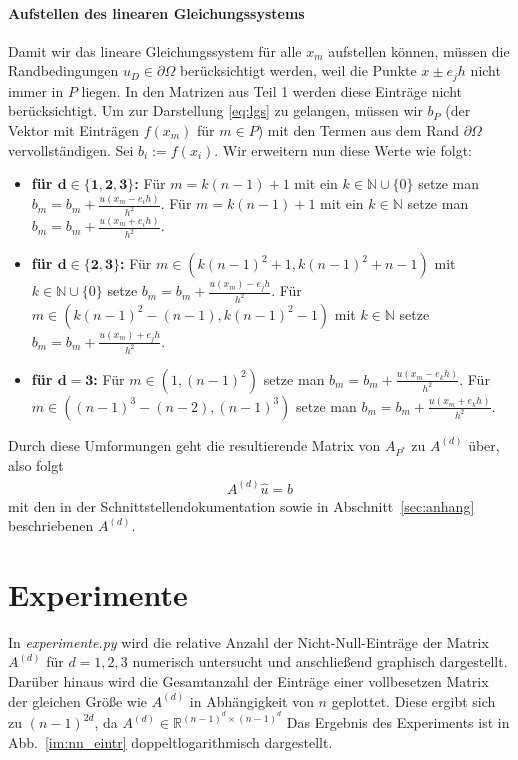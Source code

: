 \documentclass[smallheadings]{scrartcl}
\numberwithin{equation}{section}
\begin{document}
\paragraph{Aufstellen des linearen Gleichungssystems}

Damit wir das lineare Gleichungssystem für alle $x_m$ aufstellen können, müssen die Randbedingungen $u_D \in \partial\Omega$ berücksichtigt werden, weil die Punkte $x \pm e_jh$ nicht immer in $P$ liegen. In den Matrizen aus Teil 1 werden diese Einträge nicht berücksichtigt. Um zur Darstellung \eqref{eq:lgs} zu gelangen, müssen wir $b_P$ (der Vektor mit Einträgen $f(x_m)$ für $m \in P$) mit den Termen aus dem Rand $\partial\Omega$ vervollständigen. 
Sei $b_i :=f(x_i)$. Wir erweitern nun diese Werte wie folgt:

\begin{itemize}

\item \textbf{für $\boldsymbol{d\in \{1, 2, 3\} }$:}
Für $m = k(n-1)+1$ mit ein $k \in \mathbb{N}\cup \{0\}$ setze man $b_m = b_m + \frac{u(x_m - e_ih)}{h^2}$. Für $m = k(n-1) +1$ mit ein $k \in \mathbb{N}$ setze man $b_m = b_m + \frac{u(x_m + e_ih)}{h^2}$. 
\item \textbf{für $\boldsymbol{d\in \{2, 3\} }$:}
Für $m \in (k(n-1)^2+1, k(n-1)^2+n-1)$ mit  $k \in \mathbb{N}\cup \{0\}$ setze  $b_m = b_m + \frac{u(x_m)-e_jh}{h^2}$. Für $m \in (k(n-1)^2-(n-1), k(n-1)^2-1)$ mit $k \in \mathbb{N}$ setze  $b_m = b_m + \frac{u(x_m)+e_jh}{h^2}$.
\item \textbf{für $\boldsymbol{d=3 }$:}
Für $m\in (1, (n-1)^2)$ setze man $b_m = b_m + \frac{u(x_m-e_kh)}{h^2}$. Für $m\in ((n-1)^3-(n-2), (n-1)^3)$ setze man $b_m = b_m + \frac{u(x_m+e_kh)}{h^2}$.  
\end{itemize}
Durch diese Umformungen geht die resultierende Matrix von $A_{P^*}$ zu $A^{(d)}$ über, also folgt
\begin{align}
A^{(d)}\hat{u}=b
\end{align}
mit den in der Schnittstellendokumentation sowie in Abschnitt~\ref{sec:anhang} beschriebenen $A^{(d)}$.

\section{Experimente}
\label{sec:experimente}
In \textit{experimente.py} wird die relative Anzahl der Nicht-Null-Einträge der Matrix $A^{(d)}$ für $d=1,2,3$ numerisch untersucht und anschließend graphisch dargestellt. Darüber hinaus wird die Gesamtanzahl der Einträge einer vollbesetzen Matrix der gleichen Größe wie $A^{(d)}$ in Abhängigkeit von $n$ geplottet. Diese ergibt sich zu $(n-1)^{2d}$, da $A^{(d)}\in\mathbb{R}^{(n-1)^d\times(n-1)^d}$ Das Ergebnis des Experiments ist in Abb.~\ref{im:nn_eintr} doppeltlogarithmisch dargestellt.
\end{document}
